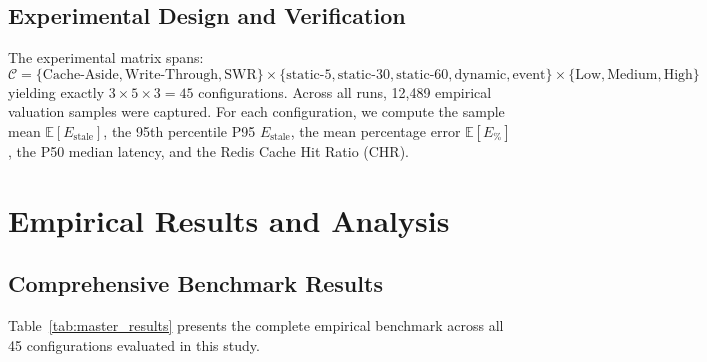 \documentclass[11pt,a4paper]{article}
\begin{document}
\subsection{Experimental Design and Verification}

The experimental matrix spans:
\begin{equation}
  \mathcal{C} = \{\text{Cache-Aside}, \text{Write-Through}, \text{SWR}\} \times \{\text{static-5}, \text{static-30}, \text{static-60}, \text{dynamic}, \text{event}\} \times \{\text{Low}, \text{Medium}, \text{High}\}
\end{equation}
yielding exactly $3 \times 5 \times 3 = 45$ configurations. Across all runs, 12{,}489 empirical valuation samples were captured. For each configuration, we compute the sample mean $\mathbb{E}[E_{\text{stale}}]$, the 95th percentile P95 $E_{\text{stale}}$, the mean percentage error $\mathbb{E}[E_{\%}]$, the P50 median latency, and the Redis Cache Hit Ratio (CHR).

\section{Empirical Results and Analysis}
\label{sec:results}

\subsection{Comprehensive Benchmark Results}

Table~\ref{tab:master_results} presents the complete empirical benchmark across all 45 configurations evaluated in this study.
\end{document}
